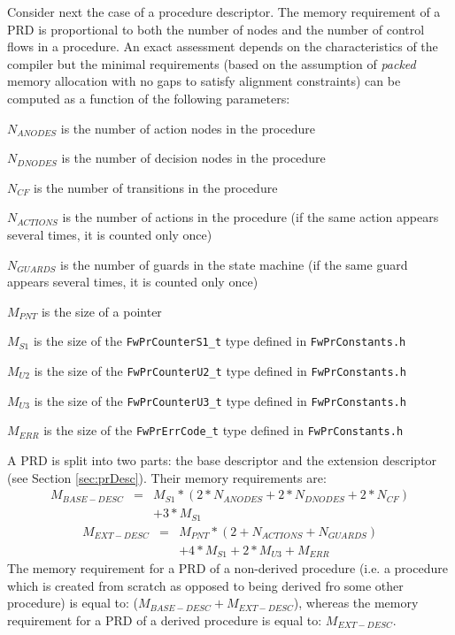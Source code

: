 \documentclass[a4paper,10pt]{article}
\newenvironment{fw_itemize}						%
{\begin{itemize}
  \setlength{\itemsep}{1mm}
  \setlength{\parskip}{0pt}
  \setlength{\parsep}{0pt}}
{\end{itemize}}
\begin{document}
Consider next the case of a procedure descriptor.
The memory requirement of a PRD is proportional to both the number of nodes and the number of control flows
in a procedure. An exact assessment depends on the characteristics of the compiler but the minimal requirements 
(based on the assumption of \emph{packed} memory allocation with no gaps to satisfy alignment constraints) 
can be computed as a function of the following parameters:

\begin{fw_itemize}
\item {$N_{ANODES}$} is the number of action nodes in the procedure
\item {$N_{DNODES}$} is the number of decision nodes in the procedure
\item {$N_{CF}$} is the number of transitions in the procedure
\item {$N_{ACTIONS}$} is the number of actions in the procedure (if the same action appears several times, it is
counted only once)
\item {$N_{GUARDS}$} is the number of guards in the state machine (if the same guard appears several times, it is counted 
only once)
\item {$M_{PNT}$} is the size of a pointer 
\item {$M_{S1}$} is the size of the \texttt{FwPrCounterS1\_t} type defined in \texttt{FwPrConstants.h} 
\item {$M_{U2}$} is the size of the \texttt{FwPrCounterU2\_t} type defined in \texttt{FwPrConstants.h} 
\item {$M_{U3}$} is the size of the \texttt{FwPrCounterU3\_t} type defined in \texttt{FwPrConstants.h} 
\item {$M_{ERR}$} is the size of the \texttt{FwPrErrCode\_t} type defined in \texttt{FwPrConstants.h} 
\end{fw_itemize}

A PRD is split into two parts: the base descriptor and the extension descriptor (see Section \ref{sec:prDesc}). 
Their memory requirements are:
\begin{eqnarray*}
M_{BASE-DESC} & = & M_{S1} * (2 * N_{ANODES} + 2 * N_{DNODES} + 2 * N_{CF}) \\
              &   & + 3 * M_{S1} 
\end{eqnarray*}
\begin{eqnarray*}
M_{EXT-DESC} & = & M_{PNT} * (2 + N_{ACTIONS} + N_{GUARDS}) \\
             &   & + 4 * M_{S1} + 2 * M_{U3} + M_{ERR}
\end{eqnarray*}
The memory requirement for a PRD of a non-derived procedure (i.e. a procedure which 
is created from scratch as opposed to being derived fro some other procedure) is equal to: 
($M_{BASE-DESC} + M_{EXT-DESC}$), whereas the memory requirement for a PRD of a derived procedure
is equal to: $M_{EXT-DESC}$.
\end{document}

